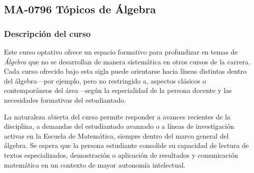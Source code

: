 \newpage
\subsection*{MA-0796 Tópicos de Álgebra}

\hypertarget{MA0796}{}
\begin{refsection}
\begin{table}[H]
\end{table}

\subsubsection*{Descripción del curso}

Este curso optativo ofrece un espacio formativo para profundizar en temas de \emph{Álgebra} que no se desarrollan de manera sistemática en otros cursos de la carrera. Cada curso ofrecido bajo esta sigla puede orientarse hacia líneas distintas dentro del álgebra---por ejemplo, pero no restringido a, aspectos clásicos o contemporáneos del área---según la especialidad de la persona docente y las necesidades formativas del estudiantado.

La naturaleza abierta del curso permite responder a avances recientes de la disciplina, a demandas del estudiantado avanzado o a líneas de investigación activas en la Escuela de Matemática, siempre dentro del marco general del álgebra. Se espera que la persona estudiante consolide su capacidad de lectura de textos especializados, demostración o aplicación de resultados y comunicación matemática en un contexto de mayor autonomía intelectual.


\end{refsection}
